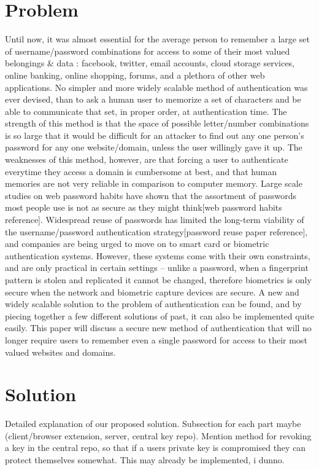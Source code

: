 \documentclass[11pt]{article}   %
\begin{document}
\section{Problem}
Until now, it was almost essential for the average person to remember a large set of username/password combinations for access to some of their most valued belongings & data : facebook, twitter, email accounts, cloud storage services, online banking, online shopping, forums, and a plethora of other web applications.  No simpler and more widely scalable method of authentication was ever devised, than to ask a human user to memorize a set of characters and be able to communicate that set, in proper order, at authentication time.  The strength of this method is that the space of possible letter/number combinations is so large that it would be difficult for an attacker to find out any one person's password for any one website/domain, unless the user willingly gave it up.  The weaknesses of this method, however, are that forcing a user to authenticate everytime they access a domain is cumbersome at best, and that human memories are not very reliable in comparison to computer memory.  Large scale studies on web password habits have shown that the assortment of passwords most people use is not as secure as they might think[web password habits reference].  Widespread reuse of passwords has limited the long-term viability of the username/password authentication strategy[password reuse paper reference], and companies are being urged to move on to smart card or biometric authentication systems.  However, these systems come with their own constraints, and are only practical in certain settings – unlike a password, when a fingerprint pattern is stolen and replicated it cannot be changed, therefore biometrics is only secure when the network and biometric capture devices are secure.  A new and widely scalable solution to the problem of authentication can be found, and by piecing together a few different solutions of past, it can also be implemented quite easily.  This paper will discuss a secure new method of authentication that will no longer require users to remember even a single password for access to their most valued websites and domains.

\section{Solution}
Detailed explanation of our proposed solution. Subsection for each part maybe (client/browser extension, server, central key repo).
Mention method for revoking a key in the central repo, so that if a users private key is compromised they can protect themselves somewhat. This may already be implemented, i dunno.
\end{document}
